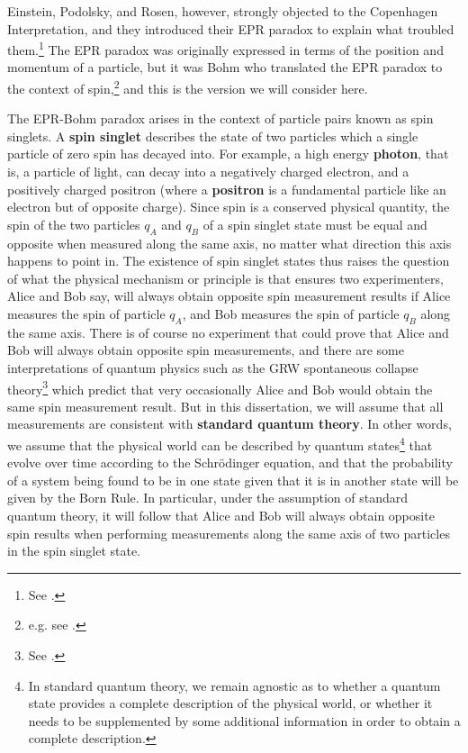 Einstein, Podolsky, and Rosen, however, strongly objected to the Copenhagen Interpretation, and they introduced their EPR paradox to explain what troubled them.\footnote{See \cite{EinsteinPodolskyRosen}.} The EPR paradox was originally expressed in terms of the position and momentum of a particle, but it was Bohm who translated the EPR paradox to the context of spin,\footnote{e.g. see \cite[p. 29, Ch. 5 sec. 3, and Ch. 22 sec. 19]{BohmQuantumTheory}. } and this is the version we will consider here.   

The EPR-Bohm paradox arises in the context of particle pairs known as spin singlets. A \textbf{spin singlet} describes the state of two particles which a single particle of zero spin has decayed into. For example, a high energy \textbf{photon}, that is, a particle of light, can decay into a negatively charged electron, and a positively charged positron (where a \textbf{positron} is a fundamental particle like an electron but of opposite charge). Since spin is a conserved physical quantity, the spin of the two particles $q_A$ and $q_B$ %
%
of a spin singlet state must be equal and opposite when measured along the same axis, no matter what direction this axis happens to point in. The existence of spin singlet states thus raises the question of what the physical mechanism or principle is that ensures two experimenters, Alice and Bob say, will always obtain opposite spin measurement results if Alice measures the spin of particle $q_A$, and Bob measures the spin of particle $q_B$ along the same axis. There is of course no experiment that could prove that Alice and Bob will always obtain opposite spin measurements, and there are some interpretations of quantum physics such as the GRW spontaneous collapse theory\footnote{See \cite{sep-qm-collapse}.} which predict that very occasionally Alice and Bob would obtain the same spin measurement result. But in this dissertation, we will assume that all measurements are consistent with \textbf{standard quantum theory}. In other words, we assume that the physical world can be described by quantum states\footnote{In standard quantum theory, we remain agnostic as to whether a quantum state provides a complete description of the physical world, or whether it needs to be supplemented by some additional information in order to obtain a complete description.} that evolve over time according to the Schr\"{o}dinger equation, and that the probability of a system being found to be in one state given that it is in another state will be given by the Born Rule.  In particular, under the assumption of standard quantum theory, it will follow that Alice and Bob will always obtain opposite spin results when performing measurements along the same axis of two particles in the spin singlet state. 

